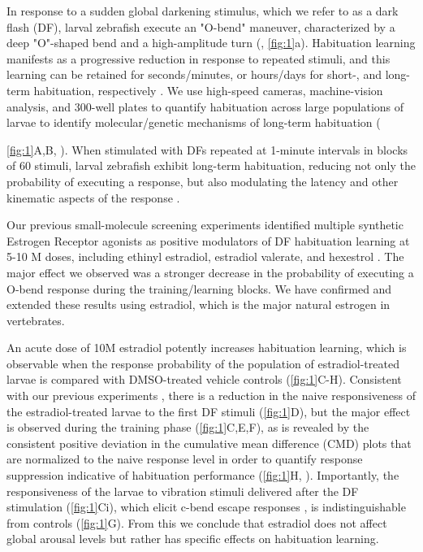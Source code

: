 \documentclass[9.5pt,lineno]{RandlettLab_elife}
\begin{document}
In response to a sudden global darkening stimulus, which we refer to as a dark flash (DF), larval zebrafish execute an "O-bend" maneuver, characterized by a deep "O"-shaped bend and a high-amplitude turn (\citep{Burgess2007}, \autoref{fig:1}a). 
Habituation learning manifests as a progressive reduction in response to repeated stimuli, and this learning can be retained for seconds/minutes, or hours/days for short-, and long-term habituation, respectively \citep{Rankin2009-no}. 
We use high-speed cameras, machine-vision analysis, and 300-well plates to quantify habituation across large populations of larvae to identify molecular/genetic mechanisms of long-term habituation ({\autoref{fig:1}A,B, \citep{Randlett2019-fj,Lamire2023-he}). 
When stimulated with DFs repeated at 1-minute intervals in blocks of 60 stimuli, larval zebrafish exhibit long-term habituation, reducing not only the probability of executing a response, but also modulating the latency and other kinematic aspects of the response \citep{Randlett2019-fj}.  


Our previous small-molecule screening experiments identified multiple synthetic Estrogen Receptor agonists as positive modulators of DF habituation learning at 5-10 \textmu M doses, including ethinyl estradiol, estradiol valerate, and hexestrol  \citep{Lamire2023-he}. 
The major effect we observed was a stronger decrease in the probability of executing a O-bend response during the training/learning blocks. 
We have confirmed and extended these results using estradiol, which is the major natural estrogen in vertebrates. 

An acute dose of 10\textmu M estradiol potently increases habituation learning, which is observable when the response probability of the population of estradiol-treated larvae is compared with DMSO-treated vehicle controls (\autoref{fig:1}C-H).
Consistent with our previous experiments \citep{Lamire2023-he}, there is a reduction in the naive responsiveness of the estradiol-treated larvae to the first DF stimuli (\autoref{fig:1}D), but the major effect is observed during the training phase (\autoref{fig:1}C,E,F), as is revealed by the consistent positive deviation in the cumulative mean difference (CMD) plots that are normalized to the naive response level in order to quantify response suppression indicative of habituation performance (\autoref{fig:1}H, \citep{Randlett2019-fj}).
Importantly, the responsiveness of the larvae to vibration stimuli delivered after the DF stimulation (\autoref{fig:1}Ci), which elicit c-bend escape responses \citep{Kimmel1974-jh}, is indistinguishable from controls (\autoref{fig:1}G). From this we conclude that estradiol does not affect global arousal levels but rather has specific effects on habituation learning. 

}
\end{document}
